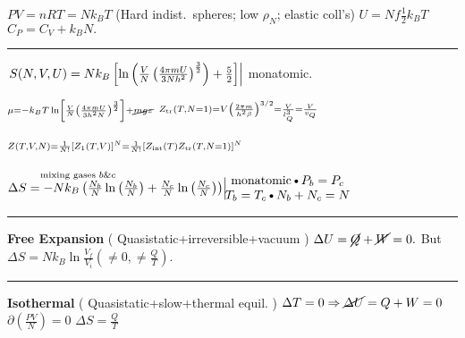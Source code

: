 \documentclass{article}
\newcommand{\YgorNoCriteria}[2]{\!\!\!\!\begin{array}{c}#1\\#2\\%
     \end{array}\!\!\!\!}
\newcommand{\YgorUD}[2]{\,\!^{#1}_{#2}}
\begin{document}
\begin{multicols}{2}
$PV  = nRT  =  Nk_{ B} T$ (Hard indist.\ spheres; low $\rho_{N}$; elastic
coll's)\quad\textbullet\quad%
    $U  =  N   f  \frac{1}{2}  k_{ B}  T$%
    \quad\textbullet\quad%
    $C_{ P}  =  C_{ V}   +  k_{ B} N .$
\hrule

%
%
$\left. S( N, V, U )  =  Nk_{B}   \left[ %
    \ln  \left(  %
      \frac{V}{N}%
        \left(  \frac{4 \pi m U}{3 N h^{2}}  \right)^{  \frac{3}{2}}%
     \right)   +  \frac{5}{2} \right] 
    \hfill\right|$ monatomic. 


$\YgorUD{%
        \mu =  - k_{ B} T \ln  \left[ \frac{V}{N}%
          \left( \frac{4\pi m U}{3h^{2}N} \right)^{  \frac{3}{2}} %
         \right]  +  \cancel{mgz}%
    }{\,}$\hfill\textbullet\hfill%
    $\YgorUD{%
        Z_{\text{tr}} ( T  , N = 1 ) = V \left(  \frac{%
        2\pi m}{h^{2}\beta}  \right)^{  3 / 2}  =\frac{V}{l_{ Q}^{3}}%
        =\frac{V}{v_{ Q}}%
    }{\,}$

    $\YgorUD{%
        Z ( T  , V  , N )  =  \frac{1}{N!}%
        [ Z_{ 1} ( T  , V ) ]^{ N}  = %
        \frac{1}{N!}%
        [ Z_{ \text{int}} ( T ) Z_{ \text{tr}} ( T  , N = 1 ) ]^{ N}%
    }{\,}$

%
$\overset{\text{mixing gases }b \&
c\quad\quad\quad\quad\quad\quad}{\Delta S   =   - N  k_{ B}%
      \left(   \frac{N_{ b}}{N} %
          \ln  \left(  \frac{N_{ b}}{N}  \right)%
      +   \frac{N_{ c}}{N} %
          \ln  \left(  \frac{N_{ c}}{N}  \right)%
      \right) }%
  \Big| \YgorNoCriteria{\text{monatomic\textbullet} P_{b}  =  P_{c}}{%
    T_{b}  =  T_{c}%
    \text{\textbullet}%
    N_{b}  +  N_{c}  =  N}$

\hrule

\textbf{Free Expansion}  ( Quasistatic+irreversible+vacuum )
$\Delta U  =  \cancel{Q}  +  \cancel{W}  =  0.$ But 
    $\Delta S  =  N k_{B} \ln\frac{V_{f}}{V_{i}} %
    (\neq  0, \neq  \frac{Q}{T})$.
\hrule

\textbf{Isothermal}  ( Quasistatic+slow+thermal equil. )
$\Delta T  =  0 \Rightarrow \cancel{\Delta U}  =  %
    Q  +  W  =  0$%
    \hfill\textbullet\hfill%
    $\partial ( \frac{PV}{N} )  =  0$%
    \hfill\textbullet\hfill%
    $\Delta S  =  \frac{Q}{T}$


\end{multicols}
\end{document}

